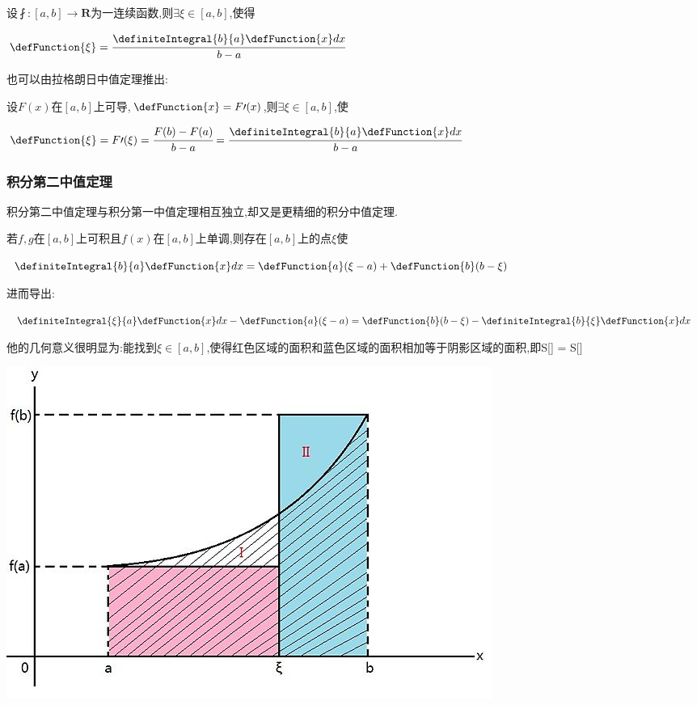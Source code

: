 {{{设$\fint : [a,b] \to \mathbf{R}$为一连续函数,则$\exists\xi\in[a,b]$,使得

$\defFunction{\xi} = \cfrac{\definiteIntegral{b}{a}\defFunction{x}dx}{b - a}$

也可以由拉格朗日中值定理推出:

设$F(x)$在$[a,b]$上可导,$\defFunction{x} = F\prime(x)$,则$\exists\xi\in[a,b]$,使

$\defFunction{\xi} = F\prime(\xi) = \cfrac{F(b) - F(a)}{b - a} = \cfrac{\definiteIntegral{b}{a}\defFunction{x}dx}{b - a}$

}%

\subsubsection{积分第二中值定理}{

积分第二中值定理与积分第一中值定理相互独立,却又是更精细的积分中值定理.

若$f,g$在$[a,b]$上可积且$f(x)$在$[a,b]$上单调,则存在$[a,b]$上的点$\xi$使

$\definiteIntegral{b}{a}\defFunction{x}dx = \defFunction{a}(\xi - a) + \defFunction{b}(b - \xi)$

进而导出:

$\definiteIntegral{\xi}{a}\defFunction{x}dx -\defFunction{a}(\xi - a) = \defFunction{b}(b - \xi) - \definiteIntegral{b}{\xi}\defFunction{x}dx$

他的几何意义很明显为:能找到$\xi\in[a,b]$,使得红色区域的面积和蓝色区域的面积相加等于阴影区域的面积,即S[\uppercase\expandafter{}] = S[\uppercase\expandafter{}]

\begin{center}
  \includegraphics{resources/Geometric_explanation_of_the_second_mean_value_theorem_for_integration.jpg}
\end{center}

}}}
